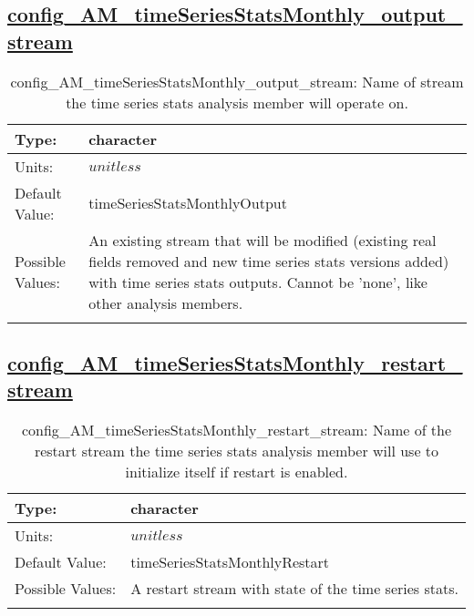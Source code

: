 \subsection[config\_AM\_timeSeriesStatsMonthly\_output\_stream]{\hyperref[sec:nm_tab_AM_timeSeriesStatsMonthly]{config\_AM\_timeSeriesStatsMonthly\_output\_stream}}
\label{subsec:nm_sec_config_AM_timeSeriesStatsMonthly_output_stream}
\begin{center}
\begin{longtable}{| p{2.0in} || p{4.0in} |}
    \hline
    Type: & character \\
    \hline
    Units: & $unitless$ \\
    \hline
    Default Value: & timeSeriesStatsMonthlyOutput \\
    \hline
    Possible Values: & An existing stream that will be modified (existing real fields removed and new time series stats versions added) with time series stats outputs. Cannot be 'none', like other analysis members. \\
    \hline
    \caption{config\_AM\_timeSeriesStatsMonthly\_output\_stream: Name of stream the time series stats analysis member will operate on.}
\end{longtable}
\end{center}
\subsection[config\_AM\_timeSeriesStatsMonthly\_restart\_stream]{\hyperref[sec:nm_tab_AM_timeSeriesStatsMonthly]{config\_AM\_timeSeriesStatsMonthly\_restart\_stream}}
\label{subsec:nm_sec_config_AM_timeSeriesStatsMonthly_restart_stream}
\begin{center}
\begin{longtable}{| p{2.0in} || p{4.0in} |}
    \hline
    Type: & character \\
    \hline
    Units: & $unitless$ \\
    \hline
    Default Value: & timeSeriesStatsMonthlyRestart \\
    \hline
    Possible Values: & A restart stream with state of the time series stats. \\
    \hline
    \caption{config\_AM\_timeSeriesStatsMonthly\_restart\_stream: Name of the restart stream the time series stats analysis member will use to initialize itself if restart is enabled.}
\end{longtable}
\end{center}

